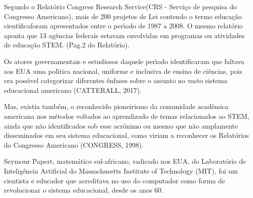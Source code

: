 \documentclass[
12pt,		%
openright,	%
twoside,  %
a4paper,			%
chapter=TITLE,		%
english,			%
french,				%
spanish,			%
brazil				%
]{USPSC-classe/USPSC}
\begin{document}
Segundo o Relat\'orio \textquotedbl Congress Research Service\textquotedbl  (CRS - Servi\c{c}o de pesquisa do Congresso Americano), mais de 200 projetos de Lei contendo o termo \textquotedbl educa\c{c}\~ao cient\'{\i}fica\textquotedbl  foram apresentados entre o per\'{\i}odo de 1987 a 2008. O mesmo relat\'orio aponta que 13 ag\^encias federais estavam envolvidas em programas ou atividades de educa\c{c}\~ao \textquotedbl STEM\textquotedbl . (Pag.2 do Relat\'orio).

















Os atores governamentais e estudiosos daquele per\'{\i}odo identificaram que faltava aos EUA uma pol\'{\i}tica nacional, uniforme e inclusiva de ensino de ci\^encias, pois era poss\'{\i}vel categorizar diferentes \^enfases sobre o assunto no vasto sistema educacional americano  (CATTERALL, 2017).

















Mas, existia tamb\'em, o reconhecido pioneirismo da comunidade acad\^emica americana nos m\'etodos voltados ao aprendizado de temas relacionados ao STEM, ainda que n\~ao identificados sob esse acr\^onimo ou mesmo que n\~ao amplamente disseminados em seu sistema educacional, como viriam a reconhecer os Relat\'orios do Congresso Americano  (CONGRESS, 1998).

















Seymour Papert, matem\'atico sul-africano, radicado nos EUA, do Laborat\'orio de Intelig\^encia Artificial do Massachusetts Institute of Technology (MIT), foi um  cientista e educador que acreditava  no  uso do computador como forma de revolucionar o sistema  educacional,  desde os anos 60.
\end{document}
